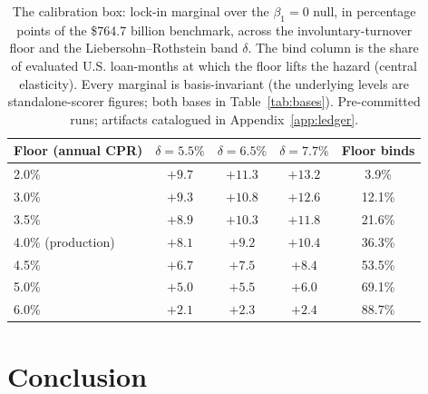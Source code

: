 \documentclass[12pt]{article}
\begin{document}
\begin{table}[H]
\centering
\caption{The calibration box: lock-in marginal over the $\beta_1 = 0$ null, in percentage points of the \$764.7 billion benchmark, across the involuntary-turnover floor and the Liebersohn--Rothstein band $\delta$. The bind column is the share of evaluated U.S. loan-months at which the floor lifts the hazard (central elasticity). Every marginal is basis-invariant (the underlying levels are standalone-scorer figures; both bases in Table~\ref{tab:bases}). Pre-committed runs; artifacts catalogued in Appendix~\ref{app:ledger}.}
\label{tab:floorband}
\begin{tabular}{lcccc}
\toprule
Floor (annual CPR) & $\delta = 5.5\%$ & $\delta = 6.5\%$ & $\delta = 7.7\%$ & Floor binds \\
\midrule
2.0\% & $+9.7$ & $+11.3$ & $+13.2$ & 3.9\% \\
3.0\% & $+9.3$ & $+10.8$ & $+12.6$ & 12.1\% \\
3.5\% & $+8.9$ & $+10.3$ & $+11.8$ & 21.6\% \\
4.0\% (production) & $+8.1$ & $+9.2$ & $+10.4$ & 36.3\% \\
4.5\% & $+6.7$ & $+7.5$ & $+8.4$ & 53.5\% \\
5.0\% & $+5.0$ & $+5.5$ & $+6.0$ & 69.1\% \\
6.0\% & $+2.1$ & $+2.3$ & $+2.4$ & 88.7\% \\
\bottomrule
\end{tabular}
\end{table}

\section{Conclusion}\label{sec:conclusion}
\end{document}
